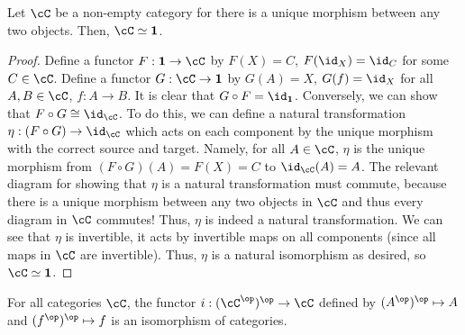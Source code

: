 \begin{prop}\label{unique-morphism-contractible} Let $\cC$ be a non-empty category for there is a unique morphism between any two objects. Then, $\cC\simeq {\bf 1}$.
\end{prop}
\begin{proof}
Define a functor $F:{\bf 1}\to \cC$ by $F(X)=C$, $F(\id_X)=\id_C$ for some $C\in \cC$. Define a functor $G:\cC\to{\bf 1}$ by $G(A)=X$, $G(f)=\id_X$ for all $A,B\in \cC$, $f:A\to B$. It is clear that $G\circ F=\id_{\bf 1}$. Conversely, we can show that $F\circ G\cong \id_{\cC}$. To do this, we can define a natural transformation $\eta:(F\circ G)\to \id_{\cC}$ which acts on each component by the unique morphism with the correct source and target. Namely, for all $A\in \cC$, $\eta$ is the unique morphism from $(F\circ G)(A)=F(X)=C$ to $\id_{\cC}(A)=A$. The relevant diagram for showing that $\eta$ is a natural transformation must commute, because there is a unique morphism between any two objects in $\cC$ and thus every diagram in $\cC$ commutes! Thus, $\eta$ is indeed a natural transformation. We can see that $\eta$ is invertible, it acts by invertible maps on all components (since all maps in $\cC$ are invertible). Thus, $\eta$ is a natural isomorphism as desired, so $\cC\simeq {\bf 1}$.
\end{proof}

\begin{ex} For all categories $\cC$, the functor $i:(\cC^{\op})^{\op}\to \cC$ defined by $(A^{\op})^{\op}\mapsto A$ and $(f^{\op})^{\op}\mapsto f$ is an isomorphism of categories.
\end{ex}

